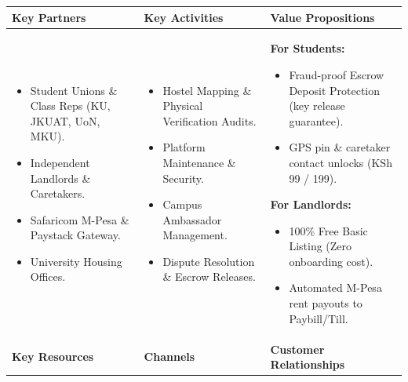 \documentclass[11pt,a4paper]{article}
\begin{document}
\noindent
\begin{tabularx}{\textwidth}{|X|X|X|}
\hline
\rowcolor{lightgray}
\textbf{Key Partners} & \textbf{Key Activities} & \textbf{Value Propositions} \\
\hline
\begin{minipage}[t]{\linewidth}\raggedright
\begin{itemize}[leftmargin=*,noitemsep,topsep=2pt,parsep=2pt]
    \item Student Unions \& Class Reps (KU, JKUAT, UoN, MKU).
    \item Independent Landlords \& Caretakers.
    \item Safaricom M-Pesa \& Paystack Gateway.
    \item University Housing Offices.
\end{itemize}
\end{minipage}
&
\begin{minipage}[t]{\linewidth}\raggedright
\begin{itemize}[leftmargin=*,noitemsep,topsep=2pt,parsep=2pt]
    \item Hostel Mapping \& Physical Verification Audits.
    \item Platform Maintenance \& Security.
    \item Campus Ambassador Management.
    \item Dispute Resolution \& Escrow Releases.
\end{itemize}
\end{minipage}
&
\begin{minipage}[t]{\linewidth}\raggedright
\textbf{For Students:}
\begin{itemize}[leftmargin=*,noitemsep,topsep=2pt,parsep=2pt]
    \item Fraud-proof Escrow Deposit Protection (key release guarantee).
    \item GPS pin \& caretaker contact unlocks (KSh 99 / 199).
\end{itemize}
\textbf{For Landlords:}
\begin{itemize}[leftmargin=*,noitemsep,topsep=2pt,parsep=2pt]
    \item 100\% Free Basic Listing (Zero onboarding cost).
    \item Automated M-Pesa rent payouts to Paybill/Till.
\end{itemize}
\end{minipage}
\\
\hline
\rowcolor{lightgray}
\textbf{Key Resources} & \textbf{Channels} & \textbf{Customer Relationships} \\

\end{tabularx}
\end{document}
